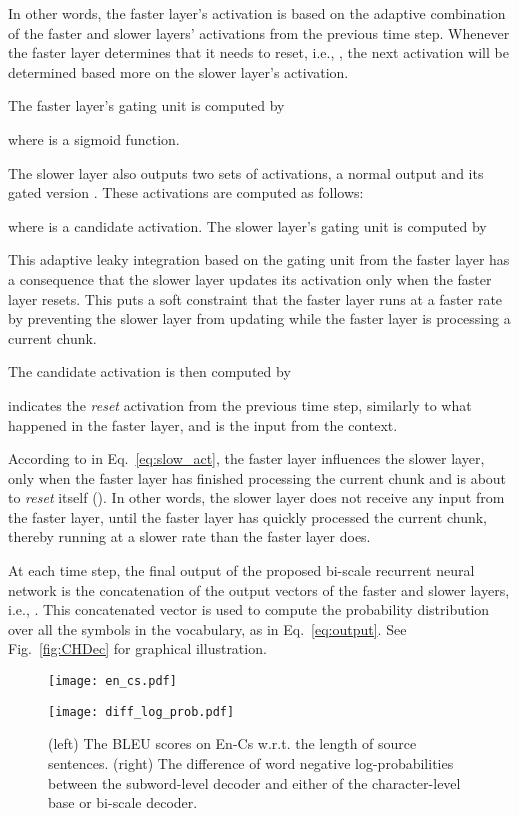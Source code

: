 \documentclass[11pt]{article}
\begin{document}
In other words, the faster layer's activation is based on the adaptive
combination of the faster and slower layers' activations from the previous time
step. Whenever the faster layer determines that it needs to reset, i.e.,
, the next activation will be determined based more on
the slower layer's activation. 

The faster layer's gating unit is computed by

where  is a sigmoid function.

The slower layer also outputs two sets of activations, a normal output
 and its gated version . These activations are 
computed as follows: 

where  is a candidate activation. The slower layer's gating
unit  is computed by


This adaptive leaky integration based on the gating unit from the faster layer
has a consequence that the slower layer updates its activation only when the
faster layer resets. This puts a soft constraint that the faster layer runs at a
faster rate by preventing the slower layer from updating while the faster layer
is processing a current chunk.

The candidate activation is then computed by


 indicates the {\em reset} activation from the previous time step,
similarly to what happened in the faster layer, 
and  is the input from the context. 

According to  in Eq.~\eqref{eq:slow_act}, the faster layer
influences the slower layer, only when the faster layer has finished processing
the current chunk and is about to {\em reset} itself ().
In other words, the slower layer does not receive any input from the faster
layer, until the faster layer has quickly processed the current chunk, thereby
running at a slower rate than the faster layer does.

At each time step, the final output of the proposed bi-scale recurrent neural
network is the concatenation of the output vectors of the faster and slower
layers, i.e., . This concatenated vector is used to
compute the probability distribution over all the symbols in the vocabulary, as
in Eq.~\eqref{eq:output}.  See Fig.~\ref{fig:CHDec} for graphical illustration.


\begin{figure}[t]
    \begin{minipage}{0.49\columnwidth}
        \centering
        \texttt{[image: en\_cs.pdf]}
    \end{minipage}
    \hfill
    \begin{minipage}{0.49\columnwidth}
        \centering
        \texttt{[image: diff\_log\_prob.pdf]}
    \end{minipage}

    \caption{(left) The BLEU scores on En-Cs w.r.t. the length of source sentences. 
        (right) The difference of word negative log-probabilities
        between the subword-level decoder and either of the character-level base
        or bi-scale decoder. 
    }
    \label{fig:qual1}

\end{figure}
\end{document}
